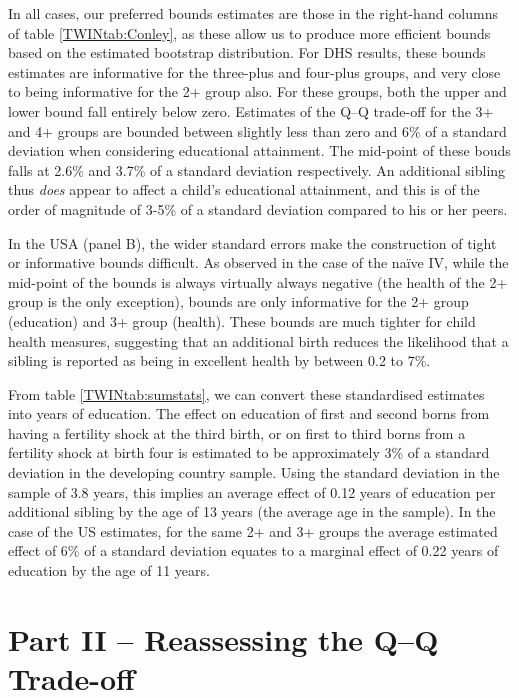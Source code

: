 \documentclass[subeqn]{article}
\begin{document}
\begin{spacing}{1.4}
In all cases, our preferred bounds estimates are those in the right-hand
columns of table \ref{TWINtab:Conley}, as these allow us to produce more
efficient bounds based on the estimated bootstrap distribution.  For DHS
results, these bounds estimates are informative for the three-plus and 
four-plus groups, and very close to being informative for the 2+ group
also.  For these groups, both the upper and lower bound fall entirely below
zero.  Estimates of the Q--Q trade-off for the 3+ and 4+ groups are bounded
between slightly less than zero and 6\% of a standard deviation when
considering educational attainment.  The mid-point of these bouds falls
at 2.6\% and 3.7\% of a standard deviation respectively. An additional
sibling thus \emph{does} appear to affect a child's educational attainment,
and this is of the order of magnitude of 3-5\% of a standard deviation
compared to his or her peers.

In the USA (panel B), the wider standard errors make the construction of tight
or informative bounds difficult.  As observed in the case of the na\"ive IV,
while the mid-point of the bounds is always virtually always negative (the
health of the 2+ group is the only exception), bounds are only informative
for the 2+ group (education) and 3+ group (health).  These bounds are much
tighter for child health measures, suggesting that an additional birth
reduces the likelihood that a sibling is reported as being in excellent health
by between 0.2 to 7\%.

From table \ref{TWINtab:sumstats}, we can convert these standardised estimates
into years of education.  The effect on education of first and second borns
from having a fertility shock at the third birth, or on first to third borns
from a fertility shock at birth four is estimated to be approximately 3\% of
a standard deviation in the developing country sample.  Using the standard
deviation in the sample of 3.8 years, this implies an average effect of 0.12
years of education per additional sibling by the age of 13 years (the average
age in the sample).  In the case of the US estimates, for the same 2+ and 3+
groups the average estimated effect of 6\% of a standard deviation equates to
a marginal effect of 0.22 years of education by the age of 11 years.

\setcounter{section}{0}
\part*{Part II -- Reassessing the Q--Q Trade-off}



\end{spacing}
\end{document}
